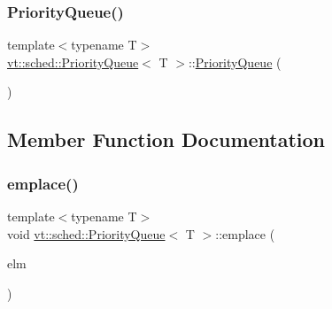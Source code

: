\subsubsection{\texorpdfstring{Priority\+Queue()}{PriorityQueue()}\hspace{0.1cm}{\footnotesize\ttfamily [3/3]}}
{\footnotesize\ttfamily template$<$typename T$>$ \\
\hyperlink{structvt_1_1sched_1_1_priority_queue}{vt\+::sched\+::\+Priority\+Queue}$<$ T $>$\+::\hyperlink{structvt_1_1sched_1_1_priority_queue}{Priority\+Queue} (\begin{DoxyParamCaption}\item[{\hyperlink{structvt_1_1sched_1_1_priority_queue}{Priority\+Queue}$<$ T $>$ \&\&}]{ }\end{DoxyParamCaption})\hspace{0.3cm}{\ttfamily [default]}}



\subsection{Member Function Documentation}
\mbox{\label{structvt_1_1sched_1_1_priority_queue_a152f4592447d7c478fe6aa0f8fbd5173}} 
\subsubsection{\texorpdfstring{emplace()}{emplace()}}
{\footnotesize\ttfamily template$<$typename T$>$ \\
void \hyperlink{structvt_1_1sched_1_1_priority_queue}{vt\+::sched\+::\+Priority\+Queue}$<$ T $>$\+::emplace (\begin{DoxyParamCaption}\item[{T \&\&}]{elm }\end{DoxyParamCaption})\hspace{0.3cm}{\ttfamily [inline]}}

\mbox{\label{structvt_1_1sched_1_1_priority_queue_aaee204c658c333cd9bb30615bcb35e07}} 
